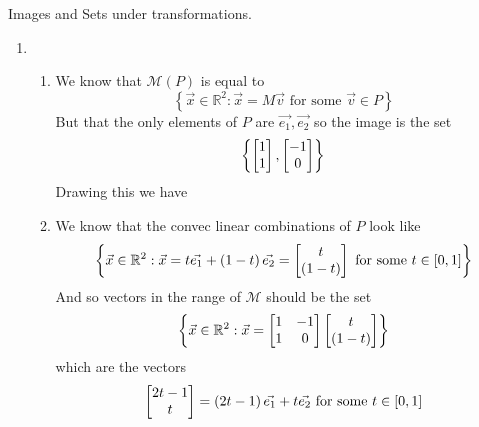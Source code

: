 \documentclass[11pt]{book}
\begin{document}
Images and Sets under transformations.

\begin{enumerate}
    \item 
    \begin{enumerate}
        \item We know that $\mathcal{M}\left(P\right)$ is equal to 
            \[
            \left\{ \vec{x} \in \mathbb{R}^2: \vec{x} = M\vec{v} \text{ for some  } \vec{v} \in P \right\}
            \]
		But that the only elements of $P$ are $\vec{e_1}, \vec{e_2}$ so the image is the set
        \begin{gather*}
            \left\{ \begin{bmatrix} 1 \\ 1 \end{bmatrix}, \begin{bmatrix} -1 \\ 0 \end{bmatrix} \right\}
        \end{gather*}
        Drawing this we have
        \begin{center}
        \end{center}
        \item We know that the convec linear combinations of $P$ look like 
            \[
                \left\{ \vec{x} \in \mathbb{R}^2: \vec{x} = t\vec{e_1} + \left( 1 - t \right)\vec{e_2} = \begin{bmatrix} t \\ \left( 1 - t \right) \end{bmatrix} \text{ for some  }t \in \left[ 0,1 \right]\right\}
            \]
            And so vectors in the range of $\mathcal{M}$ should be the set
            \[
                \left\{ \vec{x} \in \mathbb{R}^2: \vec{x} = \begin{bmatrix} 1 & -1 \\ 1 & 0 \end{bmatrix}\begin{bmatrix} t \\ \left( 1 - t \right)\end{bmatrix}  \right\}
            \]
            which are the vectors
            \[
                \begin{bmatrix} 2t - 1 \\ t \end{bmatrix} = \left( 2t - 1 \right)\vec{e_1} + t\vec{e_2} \text{ for some  } t \in \left[ 0,1 \right]
            \]
            \begin{center}
\end{center}
\end{enumerate}
\end{enumerate}
\end{document}
